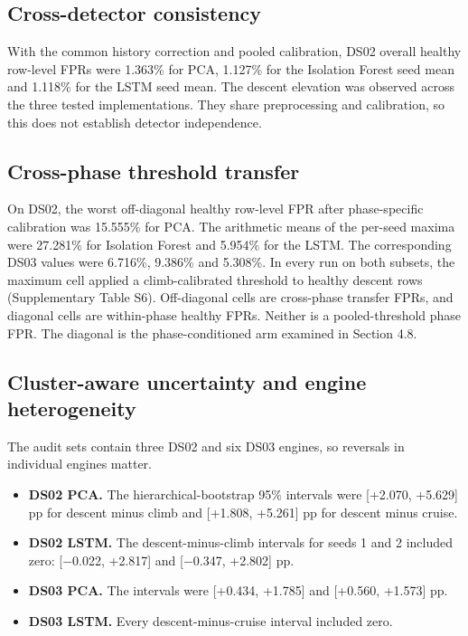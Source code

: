 \documentclass[preprint,11pt,a4paper]{elsarticle}
\begin{document}
\subsection{Cross-detector consistency}

With the common history correction and pooled calibration, DS02 overall healthy row-level FPRs were 1.363\% for PCA, 1.127\% for the Isolation Forest seed mean and 1.118\% for the LSTM seed mean. The descent elevation was observed across the three tested implementations. They share preprocessing and calibration, so this does not establish detector independence.

\subsection{Cross-phase threshold transfer}

On DS02, the worst off-diagonal healthy row-level FPR after phase-specific calibration was 15.555\% for PCA. The arithmetic means of the per-seed maxima were 27.281\% for Isolation Forest and 5.954\% for the LSTM. The corresponding DS03 values were 6.716\%, 9.386\% and 5.308\%. In every run on both subsets, the maximum cell applied a climb-calibrated threshold to healthy descent rows (Supplementary Table S6). Off-diagonal cells are cross-phase transfer FPRs, and diagonal cells are within-phase healthy FPRs. Neither is a pooled-threshold phase FPR. The diagonal is the phase-conditioned arm examined in Section 4.8.

\subsection{Cluster-aware uncertainty and engine heterogeneity}

The audit sets contain three DS02 and six DS03 engines, so reversals in individual engines matter.
\begin{itemize}
\item \textbf{DS02 PCA.} The hierarchical-bootstrap 95\% intervals were [+2.070, +5.629] pp for descent minus climb and [+1.808, +5.261] pp for descent minus cruise.
\item \textbf{DS02 LSTM.} The descent-minus-climb intervals for seeds 1 and 2 included zero: [−0.022, +2.817] and [−0.347, +2.802] pp.
\item \textbf{DS03 PCA.} The intervals were [+0.434, +1.785] and [+0.560, +1.573] pp.
\item \textbf{DS03 LSTM.} Every descent-minus-cruise interval included zero.
\end{itemize}
\end{document}
